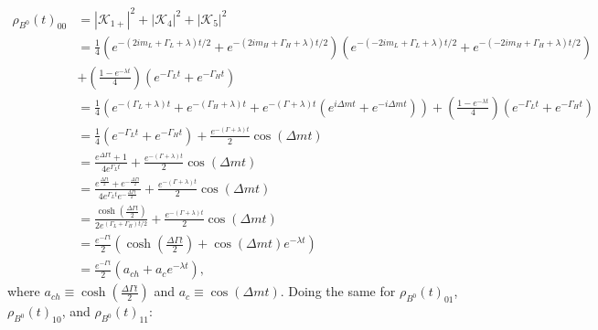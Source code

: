 \begin{align}
\rho_{B^0}(t)_{00} &= |\mathcal{K}_{1+}|^2 + |\mathcal{K}_4|^2 + |\mathcal{K}_5|^2 \nonumber \\
&= \frac{1}{4}\left(e^{-(2im_L+\Gamma_L +\lambda)t/2}+e^{-(2im_H+\Gamma_H +\lambda)t/2}\right)\left(e^{-(-2im_L+\Gamma_L +\lambda)t/2}+e^{-(-2im_H+\Gamma_H +\lambda)t/2}\right) \nonumber \\
&+ \left(\frac{1-e^{-\lambda t}}{4}\right)(e^{-\Gamma_L t} + e^{-\Gamma_H t}) \nonumber \\
&= \frac{1}{4}\left(e^{-(\Gamma_L + \lambda)t} + e^{-(\Gamma_H + \lambda)t} + e^{-(\Gamma+\lambda)t}\left(e^{i\Delta m t}+e^{-i\Delta m t}\right)\right)+ \left(\frac{1-e^{-\lambda t}}{4}\right)(e^{-\Gamma_L t} + e^{-\Gamma_H t}) \nonumber \\
&= \frac{1}{4}(e^{-\Gamma_L t} + e^{-\Gamma_H t})+\frac{e^{-(\Gamma + \lambda) t}}{2}\cos(\Delta m t) \nonumber \\
&= \frac{e^{\Delta \Gamma t}+1}{4e^{\Gamma_L t}} + \frac{e^{-(\Gamma + \lambda) t}}{2}\cos(\Delta m t) \nonumber \\
&= \frac{e^{\frac{\Delta \Gamma t}{2}}+e^{-\frac{\Delta \Gamma t}{2}}}{4e^{\Gamma_L t}e^{-\frac{\Delta \Gamma t}{2}}} + \frac{e^{-(\Gamma + \lambda) t}}{2}\cos(\Delta m t) \nonumber \\
&= \frac{\cosh\left(\frac{\Delta \Gamma t}{2}\right)}{2e^{(\Gamma_L+\Gamma_H)t/2}} + \frac{e^{-(\Gamma + \lambda) t}}{2}\cos(\Delta m t) \nonumber \\
&= \frac{e^{-\Gamma t}}{2}\left(\cosh\left(\frac{\Delta \Gamma t}{2}\right) + \cos(\Delta m t)e^{-\lambda t}\right) \nonumber \\
&= \frac{e^{-\Gamma t}}{2}\left(a_{ch} + a_c e^{-\lambda t}\right),
\end{align}
where $a_{ch}\equiv \cosh\left(\frac{\Delta \Gamma t}{2}\right)$ and $a_c\equiv \cos(\Delta m t)$. Doing the same for $\rho_{B^0}(t)_{01}$, $\rho_{B^0}(t)_{10}$, and $\rho_{B^0}(t)_{11}$:
